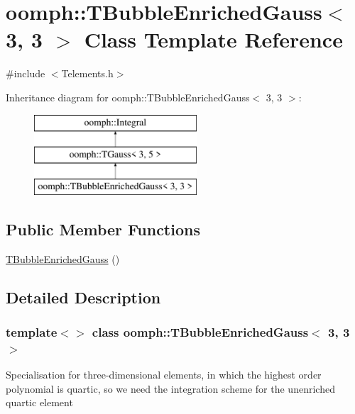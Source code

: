 \hypertarget{classoomph_1_1TBubbleEnrichedGauss_3_013_00_013_01_4}{}\section{oomph\+:\+:T\+Bubble\+Enriched\+Gauss$<$ 3, 3 $>$ Class Template Reference}
\label{classoomph_1_1TBubbleEnrichedGauss_3_013_00_013_01_4}


{\ttfamily \#include $<$Telements.\+h$>$}

Inheritance diagram for oomph\+:\+:T\+Bubble\+Enriched\+Gauss$<$ 3, 3 $>$\+:\begin{figure}[H]
\begin{center}
\leavevmode
\includegraphics[height=3.000000cm]{classoomph_1_1TBubbleEnrichedGauss_3_013_00_013_01_4}
\end{center}
\end{figure}
\subsection*{Public Member Functions}
\begin{DoxyCompactItemize}
\item 
\hyperlink{classoomph_1_1TBubbleEnrichedGauss_3_013_00_013_01_4_a608a928a0d4f296846f954af580dbbce}{T\+Bubble\+Enriched\+Gauss} ()
\end{DoxyCompactItemize}


\subsection{Detailed Description}
\subsubsection*{template$<$$>$\newline
class oomph\+::\+T\+Bubble\+Enriched\+Gauss$<$ 3, 3 $>$}

Specialisation for three-\/dimensional elements, in which the highest order polynomial is quartic, so we need the integration scheme for the unenriched quartic element 

